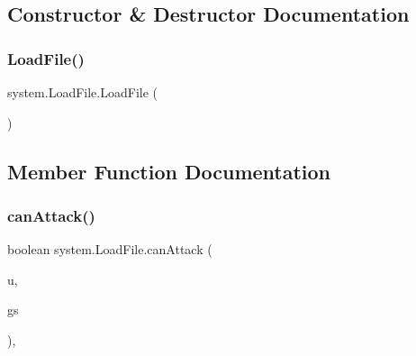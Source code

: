 \subsection{Constructor \& Destructor Documentation}
\mbox{\label{classsystem_1_1_load_file_ac5d64f03a0aeabd44ea9c6b6514112e5}} 
\subsubsection{\texorpdfstring{Load\+File()}{LoadFile()}}
{\footnotesize\ttfamily system.\+Load\+File.\+Load\+File (\begin{DoxyParamCaption}{ }\end{DoxyParamCaption})\hspace{0.3cm}{\ttfamily [inline]}}



\subsection{Member Function Documentation}
\mbox{\label{classsystem_1_1_load_file_aa76e99fc2bb6200c6905b151c0092b3b}} 
\subsubsection{\texorpdfstring{can\+Attack()}{canAttack()}}
{\footnotesize\ttfamily boolean system.\+Load\+File.\+can\+Attack (\begin{DoxyParamCaption}\item[{\mbox{\hyperlink{classgame_1_1board_1_1_unit}{Unit}}}]{u,  }\item[{\mbox{\hyperlink{classgame_1_1game_state_1_1_game_state}{Game\+State}}}]{gs }\end{DoxyParamCaption})\hspace{0.3cm}{\ttfamily [inline]}, {\ttfamily [private]}}

